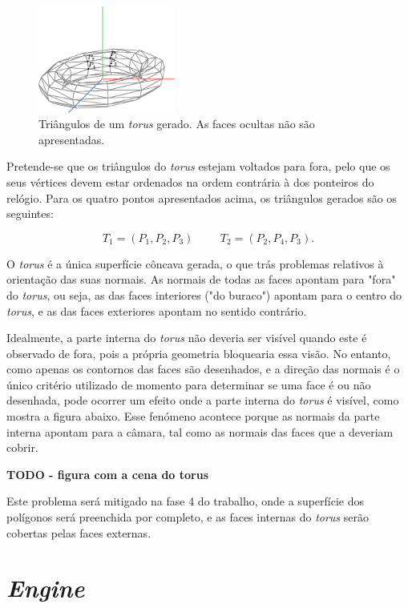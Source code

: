 \documentclass[12pt, a4paper]{article}
\begin{document}
\begin{figure}[H]
    \centering
    \includegraphics[width=0.4\textwidth]{res/figures/TorusTriangle.pdf}
    \caption{Triângulos de um \emph{torus} gerado. As faces ocultas não são apresentadas.}
\end{figure}

Pretende-se que os triângulos do \emph{torus} estejam voltados para fora, pelo que os seus vértices
devem estar ordenados na ordem contrária à dos ponteiros do relógio. Para os quatro pontos
apresentados acima, os triângulos gerados são os seguintes:

$$
T_1 = (P_1, P_2, P_3)
\hspace{1cm}
T_2 = (P_2, P_4, P_3).
$$

O \emph{torus} é a única superfície côncava gerada, o que trás problemas relativos à orientação das
suas normais. As normais de todas as faces apontam para "fora"{} do \emph{torus}, ou seja, as das
faces interiores ("do buraco"{}) apontam para o centro do \emph{torus}, e as das faces exteriores
apontam no sentido contrário.

Idealmente, a parte interna do \emph{torus} não deveria ser visível quando este é observado de fora,
pois a própria geometria bloquearia essa visão. No entanto, como apenas os contornos das faces são
desenhados, e a direção das normais é o único critério utilizado de momento para determinar se uma
face é ou não desenhada, pode ocorrer um efeito onde a parte interna do \emph{torus} é visível, como
mostra a figura abaixo. Esse fenómeno acontece porque as normais da parte interna apontam para a
câmara, tal como as normais das faces que a deveriam cobrir.

\textbf{\color{red} TODO - figura com a cena do torus}

Este problema será mitigado na fase 4 do trabalho, onde a superfície dos polígonos será preenchida
por completo, e as faces internas do \emph{torus} serão cobertas pelas faces externas.

\section{\emph{Engine}}
\end{document}
